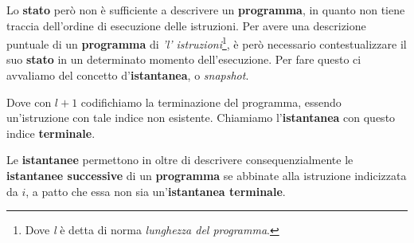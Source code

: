 Lo \textbf{stato} però non è sufficiente a descrivere un \textbf{programma}, in quanto non tiene traccia dell'ordine di esecuzione delle istruzioni.
Per avere una descrizione puntuale di un \textbf{programma} di \textit{'l' istruzioni}\footnote{Dove \textit{l} è detta di norma \textit{lunghezza del programma}.}, è però necessario contestualizzare il suo \textbf{stato} in un determinato momento dell'esecuzione.
Per fare questo ci avvaliamo del concetto d'\textbf{istantanea}, o \textit{snapshot}.


Dove con \(l+1\) codifichiamo la terminazione del programma, essendo un'istruzione con tale indice non esistente. Chiamiamo l'\textbf{istantanea} con questo indice \textbf{terminale}.

Le \textbf{istantanee} permettono in oltre di descrivere consequenzialmente le \textbf{istantanee successive}
di un \textbf{programma} se abbinate alla istruzione indicizzata da \(i\), a patto
che essa non sia un'\textbf{istantanea terminale}.


